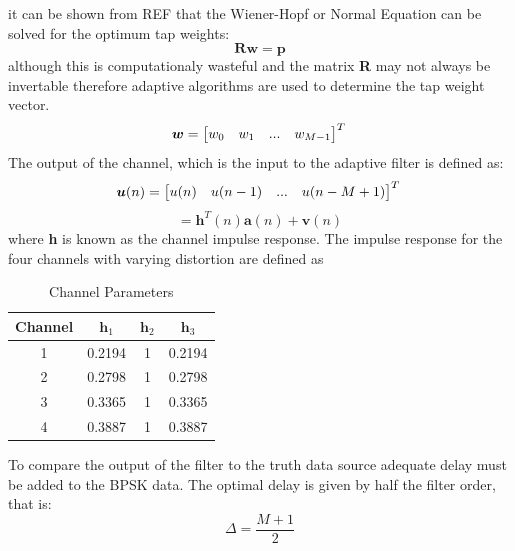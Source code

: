 \documentclass[journal]{IEEEtran}
\begin{document}
it can be shown from REF that the Wiener-Hopf or Normal Equation can be solved for
the optimum tap weights:
 $$\boldsymbol{Rw} = \boldsymbol{p}$$
although this is computationaly wasteful and the matrix \textbf{R} may not
always be invertable therefore adaptive algorithms are used to determine the tap weight vector.
\[
\boldsymbol{w} =\begin{bmatrix}w_0 & w_1 & ... & w_{M-1}\end{bmatrix}^T\\\mbox{}
\]
The output of the channel, which is the input to the adaptive filter is defined as:
\[
\boldsymbol{u}(n) =\begin{bmatrix}u(n) & u(n-1) & ...  & u(n-M+1)\end{bmatrix}^T\\\mbox{}
\]
$$= \boldsymbol{h}^T(n)\boldsymbol{a}(n) + \boldsymbol{v}(n)$$
where  \textbf{h} is known as the channel impulse response. The impulse response for the four channels
with varying distortion are defined as
\begin{table}[H]
\centering
\captionsetup{font = small}
 \begin{tabular}{ | c || c | c | c |}
    \hline
    Channel & $\boldsymbol{h}_1$ & $\boldsymbol{h}_2$ & $\boldsymbol{h}_3$\\
    \hline\hline
    1 & 0.2194 & 1 & 0.2194 \\
    \hline
    2 & 0.2798 & 1 & 0.2798 \\
    \hline
    3 & 0.3365 & 1 & 0.3365\\
    \hline
    4 & 0.3887 & 1 & 0.3887\\
    \hline
  \end{tabular}
  \caption{Channel Parameters}
  \label{table:channel}
\end{table}
To compare the output of the filter to the truth data source adequate delay must be added to the BPSK data. The optimal delay is given by
half the filter order, that is:
$$\Delta = \dfrac{M+1}{2}$$
\end{document}

